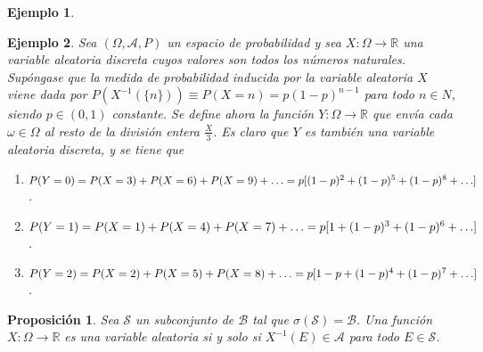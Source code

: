\documentclass[11pt]{report}
\theoremstyle{mytheorem}
\newtheorem{proposition}{Proposición}
\theoremstyle{mydefinition}
\theoremstyle{myexample}
\newtheorem*{example}{Ejemplo}
\newenvironment{cproposition} %
  {\begin{mdframed}[
        linewidth=3pt,
        linecolor=c2,
        bottomline=false,
        topline=false,
        rightline=false,
        innerrightmargin=0pt,
        innertopmargin=0pt,
        innerbottommargin=0pt,
        innerleftmargin=1em,
        skipabove=\baselineskip]
    \begin{proposition}}
  {\end{proposition}\end{mdframed}}
\newcommand{\R}{\mathbb R}
\begin{document}
\begin{example}
\end{example}

\begin{example}
Sea $(\Omega,\mathcal{A},P)$ un espacio de probabilidad y sea $X \colon \Omega \to \R$ una variable aleatoria discreta cuyos valores son todos los números naturales. Supóngase que la medida de probabilidad inducida por la variable aleatoria $X$ viene dada por $P(X^{-1}(\{n\})) \equiv P(X = n) = p(1-p)^{n-1}$ para todo $n \in N$, siendo $p \in (0,1)$ constante. Se define ahora la función $Y \colon \Omega \to \R$ que envía cada $\omega \in \Omega$ al resto de la división entera $\frac{X}{3}$. Es claro que $Y$ es también una variable aleatoria discreta, y se tiene que
\begin{enumerate}
    \item $P(Y=0) = P(X=3)+P(X=6)+P(X=9)+\mathellipsis = p[(1-p)^2+(1-p)^5+(1-p)^8+\mathellipsis]$.
    \item $P(Y=1) = P(X=1)+P(X=4)+P(X=7)+\mathellipsis = p[1+(1-p)^3+(1-p)^6+\mathellipsis]$.
    \item $P(Y=2) = P(X=2)+P(X=5)+P(X=8)+\mathellipsis = p[1-p+(1-p)^4+(1-p)^7+\mathellipsis]$.
\end{enumerate}

\end{example}

\begin{cproposition}
Sea $\mathcal{S}$ un subconjunto de $\mathcal{B}$ tal que $\sigma(\mathcal{S})=\mathcal{B}$. Una función $X \colon \Omega \to \R$ es una variable aleatoria si y solo si $X^{-1}(E) \in \mathcal{A}$ para todo $E \in \mathcal{S}$.
\end{cproposition}
\end{document}
